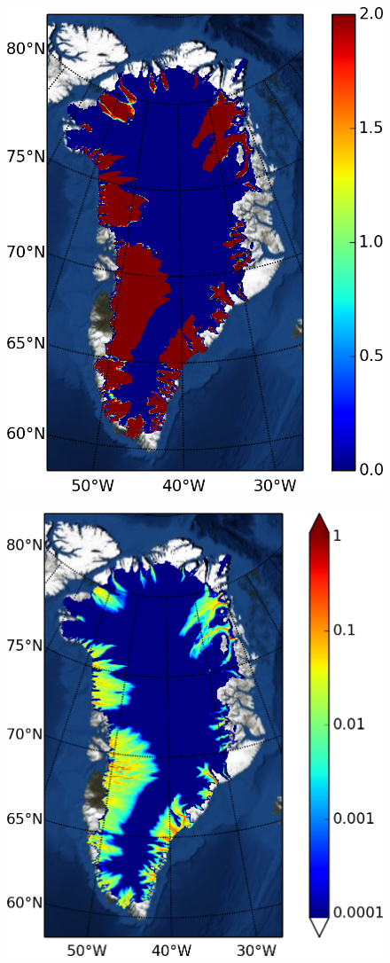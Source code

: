 \documentclass[gmd]{copernicus}   %
\begin{document}
\begin{figure}[ht]
\mbox{\includegraphics[height=\grnht,keepaspectratio=true]{routing-decoupled-tillwat} \,
\includegraphics[height=\grnht,keepaspectratio=true]{routing-decoupled-bwat}}

\end{figure}
\end{document}
